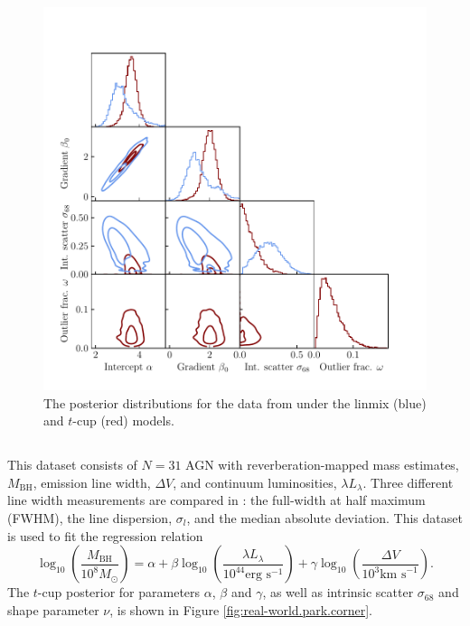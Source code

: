 \documentclass[fleqn,usenatbib]{rasti}
\begin{document}
\begin{figure}
    \includegraphics[width=\columnwidth]{graphics/real/corner_kelly.pdf}
    \caption{The posterior distributions for the data from \citet{Kelly:2007}
    under the linmix (blue) and $t$-cup (red) models.}
    \label{fig:real-world.kelly.corner}
\end{figure}

\subsection[Park et al. (2017)]{\citet{Park:2017}}

This dataset consists of $N = 31$ AGN with reverberation-mapped mass estimates,
$M_{\text{BH}}$,  emission line width, $\Delta V$, and continuum
luminosities, $\lambda L_{\lambda}$. Three different  line width
measurements are compared in \citet{Park:2017}: the full-width at half maximum
(FWHM), the line dispersion, $\sigma_l$, and the median absolute deviation. This
dataset is used to fit the regression relation
\begin{equation}
    \log_{10}\!\left( \frac{M_{\text{BH}}}{10^8 M_\odot} \right)\! =
        \alpha +
        \beta \log_{10}\! \left( \frac{\lambda L_{\lambda}}{10^{44} \text{erg s}^{-1}} \right) +
        \gamma \log_{10}\!\left( \frac{\Delta V}{10^3 \text{km s}^{-1}} \right).
\end{equation}
The $t$-cup posterior for parameters $\alpha$, $\beta$ and $\gamma$, as well as
intrinsic scatter $\sigma_{68}$ and shape parameter $\nu$, is shown in Figure
\ref{fig:real-world.park.corner}.
\end{document}
